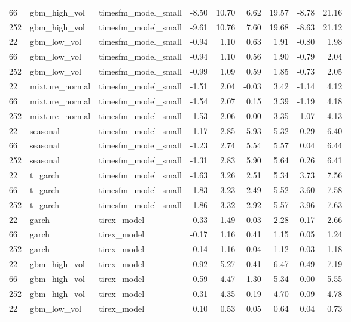 {\begin{tabular}{lllrrrrrr}
66 & gbm\_high\_vol & timesfm\_model\_small & -8.50 & 10.70 & 6.62 & 19.57 & -8.78 & 21.16 \\
252 & gbm\_high\_vol & timesfm\_model\_small & -9.61 & 10.76 & 7.60 & 19.68 & -8.63 & 21.12 \\
\midrule
22 & gbm\_low\_vol & timesfm\_model\_small & -0.94 & 1.10 & 0.63 & 1.91 & -0.80 & 1.98 \\
66 & gbm\_low\_vol & timesfm\_model\_small & -0.94 & 1.10 & 0.56 & 1.90 & -0.79 & 2.04 \\
252 & gbm\_low\_vol & timesfm\_model\_small & -0.99 & 1.09 & 0.59 & 1.85 & -0.73 & 2.05 \\
\midrule
22 & mixture\_normal & timesfm\_model\_small & -1.51 & 2.04 & -0.03 & 3.42 & -1.14 & 4.12 \\
66 & mixture\_normal & timesfm\_model\_small & -1.54 & 2.07 & 0.15 & 3.39 & -1.19 & 4.18 \\
252 & mixture\_normal & timesfm\_model\_small & -1.53 & 2.06 & 0.00 & 3.35 & -1.07 & 4.13 \\
\midrule
22 & seasonal & timesfm\_model\_small & -1.17 & 2.85 & 5.93 & 5.32 & -0.29 & 6.40 \\
66 & seasonal & timesfm\_model\_small & -1.23 & 2.74 & 5.54 & 5.57 & 0.04 & 6.44 \\
252 & seasonal & timesfm\_model\_small & -1.31 & 2.83 & 5.90 & 5.64 & 0.26 & 6.41 \\
\midrule
22 & t\_garch & timesfm\_model\_small & -1.63 & 3.26 & 2.51 & 5.34 & 3.73 & 7.56 \\
66 & t\_garch & timesfm\_model\_small & -1.83 & 3.23 & 2.49 & 5.52 & 3.60 & 7.58 \\
252 & t\_garch & timesfm\_model\_small & -1.86 & 3.32 & 2.92 & 5.57 & 3.96 & 7.63 \\
\midrule
22 & garch & tirex\_model & -0.33 & 1.49 & 0.03 & 2.28 & -0.17 & 2.66 \\
66 & garch & tirex\_model & -0.17 & 1.16 & 0.41 & 1.15 & 0.05 & 1.24 \\
252 & garch & tirex\_model & -0.14 & 1.16 & 0.04 & 1.12 & 0.03 & 1.18 \\
\midrule
22 & gbm\_high\_vol & tirex\_model & 0.92 & 5.27 & 0.41 & 6.47 & 0.49 & 7.19 \\
66 & gbm\_high\_vol & tirex\_model & 0.59 & 4.47 & 1.30 & 5.34 & 0.00 & 5.55 \\
252 & gbm\_high\_vol & tirex\_model & 0.31 & 4.35 & 0.19 & 4.70 & -0.09 & 4.78 \\
\midrule
22 & gbm\_low\_vol & tirex\_model & 0.10 & 0.53 & 0.05 & 0.64 & 0.04 & 0.73 \\

\end{tabular}}
